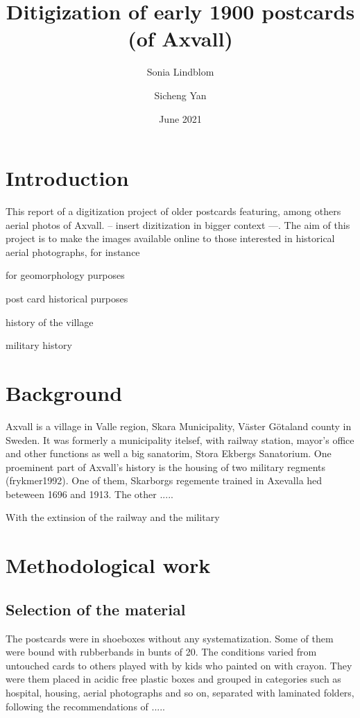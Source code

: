 \documentclass[12 pt]{paper}
\title{%
Ditigization of early 1900 postcards (of Axvall)  }
\author{Sonia Lindblom \and Sicheng Yan}
\date{June 2021}
\begin{document}


\section{Introduction}
This report of a digitization project of older postcards featuring, among others aerial photos of Axvall. -- insert dizitization in  bigger context ---. The aim of this project is to make the images available online to those interested in historical aerial photographs, for instance 
\begin{inparaenum}[i)]
	\item for geomorphology purposes \autocite[cf.][]{gomez2015}
	\item post card historical purposes
	\item history of the village
	\item military history
\end{inparaenum}
\section{Background}
Axvall is a village in Valle region, Skara Municipality, Väster Götaland county in Sweden. It was formerly a municipality itelsef, with railway station, mayor's office and other functions as well a big sanatorim, Stora Ekbergs Sanatorium. One proeminent part of Axvall's history is the housing of two military regments (frykmer1992). One of them, Skarborgs regemente trained in Axevalla hed beteween 1696 and 1913. The  other ..... 

With the extinsion of the railway and the military  


\section{Methodological work}%
\subsection{Selection of the material}

The postcards were in shoeboxes without any systematization. Some of them were bound with rubberbands in bunts of 20. The conditions varied from untouched cards to others played with by kids who painted on with crayon. They were them placed in acidic free plastic boxes and grouped in categories such as hospital, housing, aerial photographs and so on, separated with laminated folders, following the recommendations of ..... 
 
\end{document}
